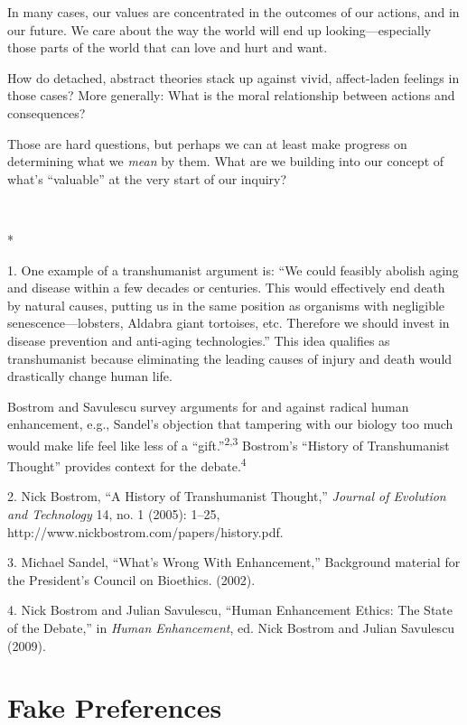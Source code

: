 {
 In many cases, our values are concentrated in the outcomes of our
actions, and in our future. We care about the way the world will end up
looking---especially those parts of the world that can love and hurt
and want.}

{
 How do detached, abstract theories stack up against vivid,
affect-laden feelings in those cases? More generally: What is the moral
relationship between actions and consequences?}

{
 Those are hard questions, but perhaps we can at least make
progress on determining what we \textit{mean} by them. What are we
building into our concept of what's
``valuable'' at the very start of
our inquiry?}

{
 ~}

{\centering
 *
\par}


\bigskip

{
 1. One example of a transhumanist argument is:
``We could feasibly abolish aging and disease within a
few decades or centuries. This would effectively end death by natural
causes, putting us in the same position as organisms with negligible
senescence---lobsters, Aldabra giant tortoises, etc. Therefore we
should invest in disease prevention and anti-aging
technologies.'' This idea qualifies as transhumanist
because eliminating the leading causes of injury and death would
drastically change human life.}

{
 Bostrom and Savulescu survey arguments for and against radical
human enhancement, e.g., Sandel's objection that
tampering with our biology too much would make life feel like less of a
``gift.''\textsuperscript{2,3}
Bostrom's ``History of Transhumanist
Thought'' provides context for the
debate.\textsuperscript{4}}

{
 2. Nick Bostrom, ``A History of Transhumanist
Thought,'' \textit{Journal of Evolution and
Technology} 14, no. 1 (2005): 1--25,
http://www.nickbostrom.com/papers/history.pdf.}

{
 3. Michael Sandel, ``What's Wrong
With Enhancement,'' Background material for the
President's Council on Bioethics. (2002).}

{
 4. Nick Bostrom and Julian Savulescu, ``Human
Enhancement Ethics: The State of the Debate,'' in
\textit{Human Enhancement}, ed. Nick Bostrom and Julian Savulescu
(2009).}

\chapter{Fake Preferences}

